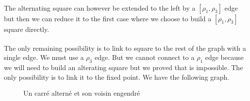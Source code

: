 \paragraph{}
The alternating square can however be extended to the left by a $[\rho_1, \rho_3]$ edge but then we can reduce it to the first case where we choose to build a $[\rho_1, \rho_3]$ square directly.

\paragraph{}
The only remaining possibility is to link to square to the rest of the graph with a single edge. We must use a $\rho_3$ edge. But we cannot connect to a $\rho_1$ edge because we will need to build an alterating square but we proved that is impossible. The only possibility is to link it to the fixed point. We have the following graph.

\begin{figure}[H]
  \begin{center}
    \caption{Un carré alterné et son voisin engendré}
  \end{center}
\end{figure}

